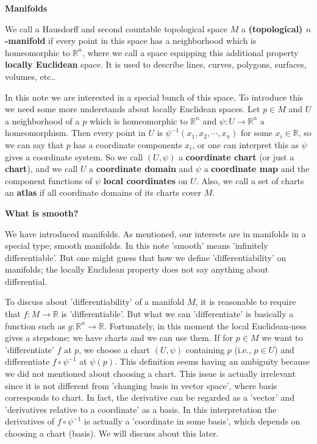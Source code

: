 \documentclass{article}
\newcommand{\ReR}{\mathbb{R}}
\begin{document}
\textbf{Manifolds}

We call a Hausdorff and second countable topological space $M$ a \textbf{(topological) $n$-manifold} if every point in this space has a neighborhood which is homeomorphic to $\ReR^n$, where we call a space equipping this additional property \textbf{locally Euclidean} space.
It is used to describe lines, curves, polygons, surfaces, volumes, etc..

In this note we are interested in a special bunch of this space.
To introduce this we need some more understands about locally Euclidean spaces.
Let $p \in M$ and $U$ a neighborhood of a $p$ which is homeomorphic to $\ReR^n$ and $\psi : U \to \ReR^n$ a homeomorphism.
Then every point in $U$ is $\psi^{-1}(x_1, x_2, \cdots, x_n)$ for some $x_i \in \ReR$, so we can say that $p$ has a coordinate components $x_i$, or one can interpret this as $\psi$ gives a coordinate system.
So we call $(U, \psi)$ a \textbf{coordinate chart} (or just a \textbf{chart}), and we call $U$ a \textbf{coordinate domain} and $\psi$ a \textbf{coordinate map} and the component functions of $\psi$ \textbf{local coordinates} on $U$.
Also, we call a set of charts an \textbf{atlas} if all coordinate domains of its charts cover $M$.

\newpage

\textbf{What is smooth?}

We have introduced manifolds.
As mentioned, our interests are in manifolds in a special type; smooth manifolds.
In this note 'smooth' means 'infinitely differentiable'.
But one might guess that how we define 'differentiability' on manifolds; the locally Euclidean property does not say anything about differential.

To discuss about 'differentiability' of a manifold $M$, it is reasonable to require that $f : M \to \ReR$ is 'differentiable'.
But what we can 'differentiate' is basically a function such as $g : \ReR^n \to \ReR$.
Fortunately, in this moment the local Euclidean-ness gives a stepstone; we have charts and we can use them.
If for $p \in M$ we want to 'differentiate' $f$ at $p$, we choose a chart $(U, \psi)$ containing $p$ (i.e., $p \in U$) and differentiate $f \circ \psi^{-1}$ at $\psi(p)$.
This definition seems having an ambiguity because we did not mentioned about choosing a chart.
This issue is actually irrelevant since it is not different from 'changing basis in vector space', where basis corresponds to chart.
In fact, the derivative can be regarded as a 'vector' and 'derivatives relative to a coordinate' as a basis.
In this interpretation the derivatives of $f \circ \psi^{-1}$ is actually a 'coordinate in some basis', which depends on choosing a chart (basis).
We will discuss about this later.
\end{document}
